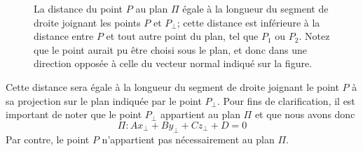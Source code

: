 \begin{figure}[h]

\caption{\label{fig:DistPointPlan}
La distance du point $P$ au plan $\Pi$ égale à la longueur du segment de droite
joignant les points $P$ et $P_\perp$; cette distance est inférieure à la distance entre
$P$ et tout autre point du plan, tel que $P_1$ ou $P_2$.
Notez que le point aurait pu être choisi sous le plan, et donc dans une direction
opposée à celle du vecteur normal indiqué sur la figure.
}
\end{figure}






Cette distance sera égale à la longueur du segment de droite joignant le point $P$ à
sa projection sur le plan indiquée par le point $P_\perp$.
Pour fins de clarification, il est important de noter que le point   $P_\perp$ appartient
au plan $\Pi$ et que nous avons donc
\[
\Pi: Ax_\perp + By_\perp + Cz_\perp + D = 0
\]
Par contre, le point $P$ n'appartient pas nécessairement au plan $\Pi$.

